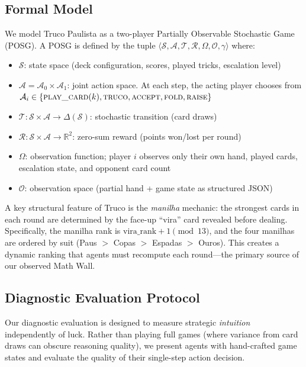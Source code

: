 \documentclass[11pt]{article}
\begin{document}
\subsection{Formal Model}
We model Truco Paulista as a two-player Partially Observable Stochastic Game (POSG). A POSG is defined by the tuple $\langle \mathcal{S}, \mathcal{A}, \mathcal{T}, \mathcal{R}, \Omega, \mathcal{O}, \gamma \rangle$ where:
\begin{itemize}
    \item $\mathcal{S}$: state space (deck configuration, scores, played tricks, escalation level)
    \item $\mathcal{A} = \mathcal{A}_0 \times \mathcal{A}_1$: joint action space. At each step, the acting player chooses from $\mathcal{A}_i \in \{\textsc{play\_card}(k), \textsc{truco}, \textsc{accept}, \textsc{fold}, \textsc{raise}\}$
    \item $\mathcal{T}: \mathcal{S} \times \mathcal{A} \to \Delta(\mathcal{S})$: stochastic transition (card draws)
    \item $\mathcal{R}: \mathcal{S} \times \mathcal{A} \to \mathbb{R}^2$: zero-sum reward (points won/lost per round)
    \item $\Omega$: observation function; player $i$ observes only their own hand, played cards, escalation state, and opponent card count
    \item $\mathcal{O}$: observation space (partial hand + game state as structured JSON)
\end{itemize}

A key structural feature of Truco is the \textit{manilha} mechanic: the strongest cards in each round are determined by the face-up ``vira'' card revealed before dealing. Specifically, the manilha rank is $\text{vira\_rank} + 1 \pmod{13}$, and the four manilhas are ordered by suit (Paus $>$ Copas $>$ Espadas $>$ Ouros). This creates a dynamic ranking that agents must recompute each round---the primary source of our observed Math Wall.

\subsection{Diagnostic Evaluation Protocol}

Our diagnostic evaluation is designed to measure strategic \textit{intuition} independently of luck. Rather than playing full games (where variance from card draws can obscure reasoning quality), we present agents with hand-crafted game states and evaluate the quality of their single-step action decision.
\end{document}
